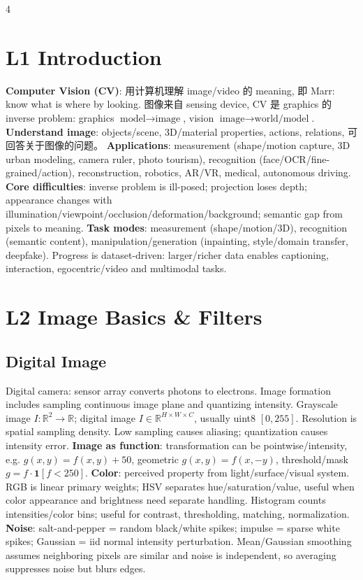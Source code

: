 \documentclass[8pt,a4paper,landscape]{extarticle}
\newcommand{\key}[1]{\textbf{#1}}
\newcommand{\R}{\mathbb{R}}
\begin{document}
\tiny
\begin{multicols*}{4}

\section{L1 Introduction}
\key{Computer Vision (CV)}: 用计算机理解 image/video 的 meaning, 即 Marr: know what is where by looking. 图像来自 sensing device, CV 是 graphics 的 inverse problem: graphics $\text{model}\to\text{image}$, vision $\text{image}\to\text{world/model}$. \key{Understand image}: objects/scene, 3D/material properties, actions, relations, 可回答关于图像的问题。
\key{Applications}: measurement (shape/motion capture, 3D urban modeling, camera ruler, photo tourism), recognition (face/OCR/fine-grained/action), reconstruction, robotics, AR/VR, medical, autonomous driving. \key{Core difficulties}: inverse problem is ill-posed; projection loses depth; appearance changes with illumination/viewpoint/occlusion/deformation/background; semantic gap from pixels to meaning.
\key{Task modes}: measurement (shape/motion/3D), recognition (semantic content), manipulation/generation (inpainting, style/domain transfer, deepfake). Progress is dataset-driven: larger/richer data enables captioning, interaction, egocentric/video and multimodal tasks.

\section{L2 Image Basics \& Filters}
\subsection{Digital Image}
Digital camera: sensor array converts photons to electrons. Image formation includes sampling continuous image plane and quantizing intensity. Grayscale image $I:\R^2\to\R$; digital image $I\in\R^{H\times W\times C}$, usually uint8 $[0,255]$. Resolution is spatial sampling density. Low sampling causes aliasing; quantization causes intensity error.
\key{Image as function}: transformation can be pointwise/intensity, e.g. $g(x,y)=f(x,y)+50$, geometric $g(x,y)=f(x,-y)$, threshold/mask $g=f\cdot\mathbf 1[f<250]$.
\key{Color}: perceived property from light/surface/visual system. RGB is linear primary weights; HSV separates hue/saturation/value, useful when color appearance and brightness need separate handling. Histogram counts intensities/color bins; useful for contrast, thresholding, matching, normalization.
\key{Noise}: salt-and-pepper = random black/white spikes; impulse = sparse white spikes; Gaussian = iid normal intensity perturbation. Mean/Gaussian smoothing assumes neighboring pixels are similar and noise is independent, so averaging suppresses noise but blurs edges.


\end{multicols*}
\end{document}
